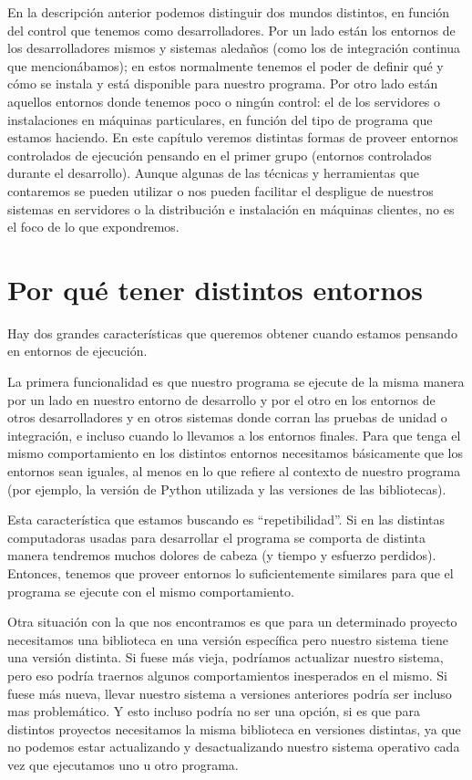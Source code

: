 En la descripción anterior podemos distinguir dos mundos distintos, en función del control que tenemos como desarrolladores. Por un lado están los entornos de los desarrolladores mismos y sistemas aledaños (como los de integración continua que mencionábamos); en estos normalmente tenemos el poder de definir qué y cómo se instala y está disponible para nuestro programa. Por otro lado están aquellos entornos donde tenemos poco o ningún control: el de los servidores o instalaciones en máquinas particulares, en función del tipo de programa que estamos haciendo. En este capítulo veremos distintas formas de proveer entornos controlados de ejecución pensando en el primer grupo (entornos controlados durante el desarrollo). Aunque algunas de las técnicas y herramientas que contaremos se pueden utilizar o nos pueden facilitar el despligue de nuestros sistemas en servidores o la distribución e instalación en máquinas clientes, no es el foco de lo que expondremos.


\section{Por qué tener distintos entornos}

Hay dos grandes características que queremos obtener cuando estamos pensando en entornos de ejecución.

La primera funcionalidad es que nuestro programa se ejecute de la misma manera por un lado en nuestro entorno de desarrollo y por el otro en los entornos de otros desarrolladores y en otros sistemas donde corran las pruebas de unidad o integración, e incluso cuando lo llevamos a los entornos finales. Para que tenga el mismo comportamiento en los distintos entornos necesitamos básicamente que los entornos sean iguales, al menos en lo que refiere al contexto de nuestro programa (por ejemplo, la versión de Python utilizada y las versiones de las bibliotecas).

Esta característica que estamos buscando es ``repetibilidad''. Si en las distintas computadoras usadas para desarrollar el programa se comporta de distinta manera tendremos muchos dolores de cabeza (y tiempo y esfuerzo perdidos). Entonces, tenemos que proveer entornos lo suficientemente similares para que el programa se ejecute con el mismo comportamiento.

Otra situación con la que nos encontramos es que para un determinado proyecto necesitamos una biblioteca en una versión específica pero nuestro sistema tiene una versión distinta. Si fuese más vieja, podríamos actualizar nuestro sistema, pero eso podría traernos algunos comportamientos inesperados en el mismo. Si fuese más nueva, llevar nuestro sistema a versiones anteriores podría ser incluso mas problemático. Y esto incluso podría no ser una opción, si es que para distintos proyectos necesitamos la misma biblioteca en versiones distintas, ya que no podemos estar actualizando y desactualizando nuestro sistema operativo cada vez que ejecutamos uno u otro programa.


